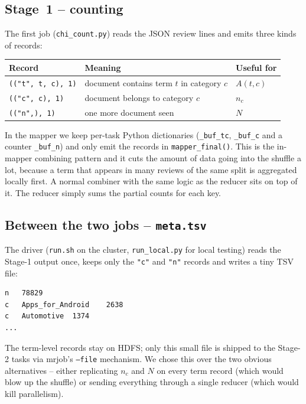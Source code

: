 \documentclass[11pt,a4paper]{article}
\begin{document}
\subsection{Stage~1 -- counting}

The first job (\texttt{chi\_count.py}) reads the JSON review lines and
emits three kinds of records:

\begin{center}\small
\begin{tabular}{@{}lll@{}}
    \toprule
    Record                           & Meaning                                  & Useful for \\
    \midrule
    \texttt{(("t",\,t,\,c),\,1)}     & document contains term $t$ in category $c$ & $A(t,c)$ \\
    \texttt{(("c",\,c),\,1)}         & document belongs to category $c$          & $n_c$     \\
    \texttt{(("n",),\,1)}            & one more document seen                    & $N$       \\
    \bottomrule
\end{tabular}
\end{center}

In the mapper we keep per-task Python dictionaries
(\texttt{\_buf\_tc}, \texttt{\_buf\_c} and a counter \texttt{\_buf\_n})
and only emit the records in \texttt{mapper\_final()}. This is the
in-mapper combining pattern and it cuts the amount of data going into
the shuffle a lot, because a term that appears in many reviews of the
same split is aggregated locally first. A normal combiner with the
same logic as the reducer sits on top of it. The reducer simply sums
the partial counts for each key.

\subsection{Between the two jobs -- \texttt{meta.tsv}}

The driver (\texttt{run.sh} on the cluster, \texttt{run\_local.py} for
local testing) reads the Stage-1 output once, keeps only the
\texttt{"c"} and \texttt{"n"} records and writes a tiny TSV file:

\begin{lstlisting}[caption={\texttt{meta.tsv} (excerpt)}]
n	78829
c	Apps_for_Android	2638
c	Automotive	1374
...
\end{lstlisting}

The term-level records stay on HDFS; only this small file is shipped
to the Stage-2 tasks via mrjob's \texttt{--file} mechanism. We chose
this over the two obvious alternatives -- either replicating $n_c$ and
$N$ on every term record (which would blow up the shuffle) or sending
everything through a single reducer (which would kill parallelism).
\end{document}

